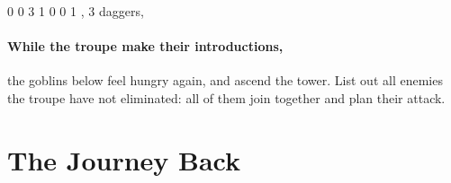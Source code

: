 \begin{multicols}{2}
{0}%
{0}%
{{3}%
{1}%
{0}}%
{0}%
{1}%
{\setcounter{Projectiles}{1}\setcounter{Academics}{2}\setcounter{Crafts}{1}\setcounter{Deceit}{1}\setcounter{Medicine}{2}\setcounter{Vigilance}{1}}%
{\shortsword, 3 daggers, \partialleather}%
{
  \addtocounter{fp}{10}
  \setcounter{Fire}{3}
  \setcounter{Air}{2}
  \setcounter{Earth}{1}
}

\showStdSpells

\paragraph{While the troupe make their introductions,}
the goblins below feel hungry again, and ascend the tower.
List out all enemies the troupe have not eliminated: all of them join together and plan their attack.

\end{multicols}

\section{The Journey Back}
\label{siege}

